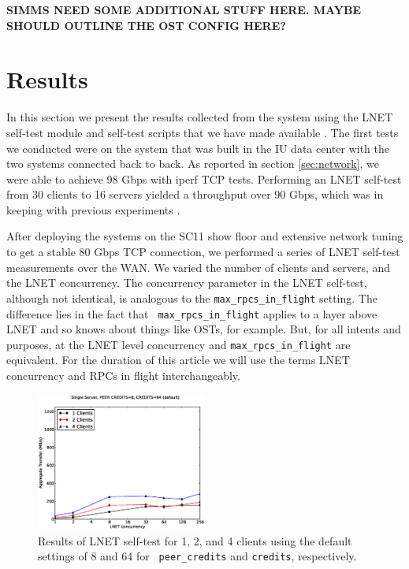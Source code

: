 \documentclass[]{sigplan-proc}
\begin{document}
{\bf SIMMS NEED SOME ADDITIONAL STUFF HERE. MAYBE SHOULD OUTLINE THE OST CONFIG HERE?}

\section{Results}\label{sec:results}

In this section we present the results collected from the system using the LNET self-test module and self-test
scripts that we have made available \cite{lstgithub2011}. The first tests we conducted were on the system that
was built in the IU data center with the two systems connected back to back. As reported in section
\ref{sec:network}, we were able to achieve 98 Gbps with iperf TCP tests. Performing an LNET self-test from 30
clients to 16 servers yielded a throughput over 90 Gbps, which was in keeping with previous experiments
\cite{kluge2012}.

After deploying the systems on the SC11 show floor and extensive network tuning to get a stable 80 Gbps TCP
connection, we performed a series of LNET self-test measurements over the WAN. We varied the number of clients
and servers, and the LNET concurrency. The concurrency parameter in the LNET self-test, although not
identical, is analogous to the {\tt max\_rpcs\_in\_flight} setting. The difference lies in the fact that {\tt
  max\_rpcs\_in\_flight} applies to a layer above LNET and so knows about things like OSTs, for example. But,
for all intents and purposes, at the LNET level concurrency and {\tt max\_rpcs\_in\_flight} are
equivalent. For the duration of this article we will use the terms LNET concurrency and RPCs in flight
interchangeably.  

\begin{figure}
\centering
\includegraphics[width=0.50\textwidth]{figures/default_pc_plot.eps}
\caption{Results of LNET self-test for 1, 2, and 4 clients using the default settings of 8 and 64 for {\tt
    peer\_credits} and {\tt credits}, respectively.}
\label{fig:default}
\end{figure}
\end{document}
